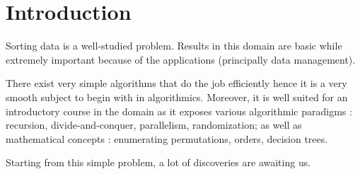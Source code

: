 \section{Introduction}
\label{tree:sorting:intro}

Sorting data is a well-studied problem. Results in this domain are basic while
extremely important because of the applications (principally data management).

There exist very simple algorithms that do the job efficiently hence it is a
very smooth subject to begin with in algorithmics. Moreover, it is well suited
for an introductory course in the domain as it exposes various algorithmic
paradigms : recursion, divide-and-conquer, parallelism, randomization; as well
as mathematical concepts : enumerating permutations, orders, decision trees.

Starting from this simple problem, a lot of discoveries are awaiting us.
